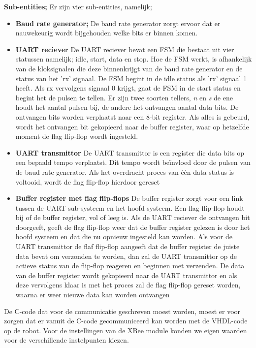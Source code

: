 \documentclass{report}
\begin{document}
\textbf{Sub-entities;}
\newline
Er zijn vier sub-entities, namelijk;
\begin{itemize}
\item  \textbf{Baud rate generator;}
\newline
De baud rate generator zorgt ervoor dat er nauwekeurig wordt bijgehouden welke bits er binnen komen.

\item \textbf{UART reciever}
\newline 
De UART reciever bevat een FSM die bestaat uit vier statussen namelijk; idle, start, data en stop.
Hoe de FSM werkt, is afhankelijk van de kloksignalen die deze binnenkrijgt van de baud rate generator en de status van het 'rx' signaal.
De FSM begint in de idle status als 'rx' signaal 1 heeft. Als rx vervolgens signaal 0 krijgt, gaat de FSM in de start status en begint het de pulsen te tellen. Er zijn twee soorten tellers, \textit{n} en \textit{s} de ene houdt het aantal pulsen bij, de andere het ontvangen aantal data bits. De ontvangen bits worden verplaatst naar een 8-bit register. Als alles is gebeurd, wordt het ontvangen bit gekopieerd naar de buffer register, waar op hetzelfde moment de flag flip-flop wordt ingesteld.
 
 \item \textbf{UART transmittor}
 \newline
 De UART transmittor is een register die data bits op een bepaald tempo verplaatst. Dit tempo wordt beïnvloed door de pulsen van de baud rate generator. Als het overdracht proces van één data status is voltooid, wordt de flag flip-flop hierdoor gereset
 
 \item \textbf{Buffer register met flag flip-flops}
 \newline
 De buffer register zorgt voor een link tussen de UART sub-systeem en het hoofd systeem. Een flag flip-flop houdt bij of de buffer register, vol of leeg is.
\newline
Als de UART reciever de ontvangen bit doorgeeft, geeft de flag flip-flop weer dat de buffer register gelezen is door het hoofd systeem en dat die nu opnieuw ingesteld kan worden.
\newline
Als voor de UART transmittor de flaf flip-flop aangeeft dat de buffer register de juiste data bevat om verzonden te worden, dan zal de UART transmittor op de actieve status van de flip-flop reageren en beginnen met verzenden. De data van de buffer register wordt gekopieerd naar de UART transmittor en als deze vervolgens klaar is met het proces zal de flag flip-flop gereset worden, waarna er weer nieuwe data kan worden ontvangen 
 
\end{itemize}
De C-code dat voor de communicatie geschreven moest worden, moest er voor zorgen dat er vanuit de C-code gecommuniceerd kan worden met de VHDL-code op de robot.
\newline
Voor de instellingen van de XBee module konden we eigen waarden voor de verschillende instelpunten kiezen.
\end{document}

